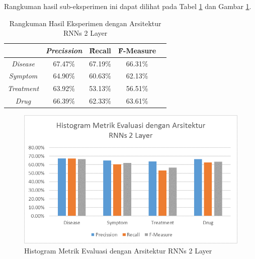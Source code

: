     Rangkuman hasil sub-eksperimen ini dapat dilihat pada Tabel \ref{table:owndict10} dan Gambar \ref{fig:owndict10}.
    
    \begin{table}
    	\centering
    	\caption{Rangkuman Hasil Eksperimen dengan Arsitektur RNNs 2 Layer}
    	\begin{tabular}{|c|c|c|c|c|}
    		\hline
    		& \textit{Precission} & \f{\f{Recall}} & \f{\f{F-Measure}} \\ \hline
    		\textit{Disease}      & 67.47\%             & 67.19\%        & 66.31\%           \\ \hline
    		\textit{Symptom}      & 64.90\%             & 60.63\%        & 62.13\%           \\ \hline
    		\textit{Treatment}    & 63.92\%             & 53.13\%        & 56.51\%           \\ \hline
    		\textit{Drug}		  & 66.39\%             & 62.33\%        & 63.61\%           \\ \hline
    	\end{tabular}
    	\label{table:owndict10}
    \end{table}
    
    \begin{figure}
    	\centering
    	\includegraphics[width=0.85\linewidth]{images/histogramrnnv2}
    	\caption{Histogram Metrik Evaluasi dengan Arsitektur RNNs 2 Layer}
    	\label{fig:owndict10}
    \end{figure}